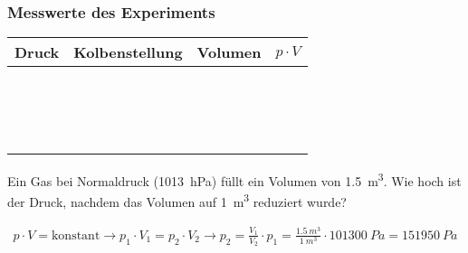 \subsubsection*{Messwerte des Experiments}

\begin{center}
\begin{tabular}{p{3cm}|p{3cm}||p{3cm}|p{3cm}}
	\large{Druck} & \large{Kolbenstellung}  & \large{Volumen}  & $p\cdot V$\\\hline
	              &                         &                  & \\
	              &                         &                  & \\\hline
	              &                         &                  & \\
	              &                         &                  & \\\hline
	              &                         &                  & \\
	              &                         &                  & \\\hline
	              &                         &                  & \\
	              &                         &                  & \\\hline
	              &                         &                  & \\
	              &                         &                  & \\\hline
	              &                         &                  & \\
	              &                         &                  & \\\hline
	              &                         &                  & \\
	              &                         &                  & \\\hline
	              &                         &                  & \\
	              &                         &                  & \\\hline
\end{tabular}
\end{center}




\begin{aufgabe}
	Ein Gas bei Normaldruck (\SI{1013}{hPa}) füllt ein Volumen von \SI{1.5}{m^3}. Wie hoch ist der Druck,
	nachdem das Volumen auf \SI{1}{m^3} reduziert wurde?
	\begin{loesung}
		\begin{eqnarray*}
			p\cdot V = \text{konstant} \to p_1\cdot V_1 = p_2\cdot V_2 \to p_2 =\frac{V_1}{V_2}\cdot p_1=\frac{\SI{1.5}{m^3}}{\SI{1}{m^3}}\cdot \SI{101300}{Pa}=\SI{151950}{Pa}
		\end{eqnarray*}
	\end{loesung}
\end{aufgabe}

